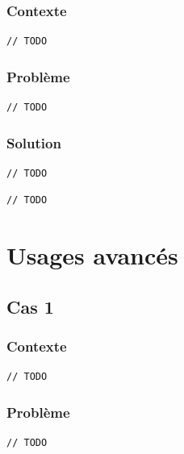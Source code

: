 \documentclass[draft]{beamer}
\DeclareRobustCommand{\todo}[1]{\ifdraft{\textbf{\textcolor{red}{[#1]}}}{}}
\begin{document}
\begin{frame}[fragile]
\frametitle{Contexte}
\todo{? extends X}
\todo{? super X}
\todo{cheat sheet, diagramme question-réponse}
\begin{block}{\todo{todo}}
 \todo{todo}
\end{block}
\begin{lstlisting}
// TODO
\end{lstlisting}
\end{frame}

\begin{frame}[fragile]
\frametitle{Problème}
\begin{alertblock}{\todo{todo}}
 \todo{todo}
\end{alertblock}
\begin{lstlisting}
// TODO
\end{lstlisting}
\end{frame}

\begin{frame}[fragile]
\frametitle{Solution}
\begin{exampleblock}{\todo{todo}}
\begin{lstlisting}[numbers=none]
// TODO
\end{lstlisting}
\end{exampleblock}
\begin{lstlisting}
// TODO
\end{lstlisting}
\end{frame}

\section{Usages avancés}

\subsection{Cas 1}

\begin{frame}[fragile]
\frametitle{Contexte}
\begin{block}{\todo{todo}}
 \todo{todo}
\end{block}
\begin{lstlisting}
// TODO
\end{lstlisting}
\end{frame}

\begin{frame}[fragile]
\frametitle{Problème}
\begin{alertblock}{\todo{todo}}
 \todo{todo}
\end{alertblock}
\begin{lstlisting}
// TODO
\end{lstlisting}
\end{frame}
\end{document}
